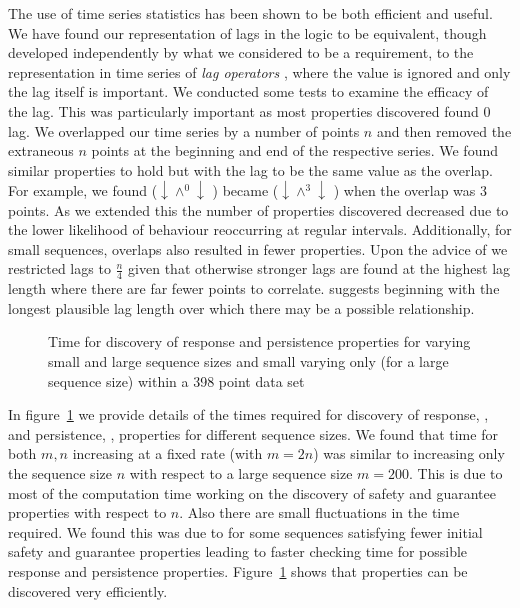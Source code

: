 \medskip

The use of time series statistics has been shown to be both efficient and
useful. We have found our representation of lags in the logic to be
equivalent, though developed independently by what we considered to be a requirement, to the representation in time series of {\em lag
operators} \cite{end95}, where the value is ignored and only the lag
itself is important. We conducted some tests to examine the efficacy
of the lag. This was particularly important as most properties
discovered found 0 lag. We overlapped our time series by a number of
points $n$ and then removed the extraneous $n$ points at the beginning
and end of the respective series. We found similar properties to hold
but with the lag to be the same value as the overlap. For example, we
found  ($\downarrow \wedge^{0}\downarrow$ ) became
 ($\downarrow \wedge^{3}\downarrow$ ) when the overlap
was 3 points. As we extended
this the number of properties discovered decreased due to the lower
likelihood of behaviour reoccurring at regular intervals. Additionally,
for small sequences, overlaps also resulted in fewer properties. Upon
the advice of \cite{ko90} we restricted lags to $\frac{n}{4}$ given
that otherwise stronger lags are found at the highest lag length where
there are far fewer points to correlate.  \cite{end95} suggests
beginning with the longest plausible lag length over which there may
be a possible relationship.


\begin{figure}
\centerline{}
\caption{\label{graph:prop_disc_time}{Time for discovery of
response and persistence properties for varying small and large
sequence sizes and small varying only (for a large sequence size)
within a 398 point data set}}
\end{figure}

In figure~\ref{graph:prop_disc_time} we provide details of the times
required for discovery of response, , and persistence, ,
properties for different sequence 
sizes. We found that time for both $m,n$ increasing at a fixed rate
(with $m = 2n$) was
similar to increasing only the sequence size $n$ with respect to a
large sequence size $m = 200$. This is due to most of the computation
time working on the discovery of safety and guarantee properties with
respect to $n$. Also there are small fluctuations in the time
required. We found this was due to for some sequences satisfying fewer
initial safety and guarantee properties leading to faster checking
time for possible response and persistence
properties. Figure~\ref{graph:prop_disc_time} shows that properties
can be discovered very efficiently.

